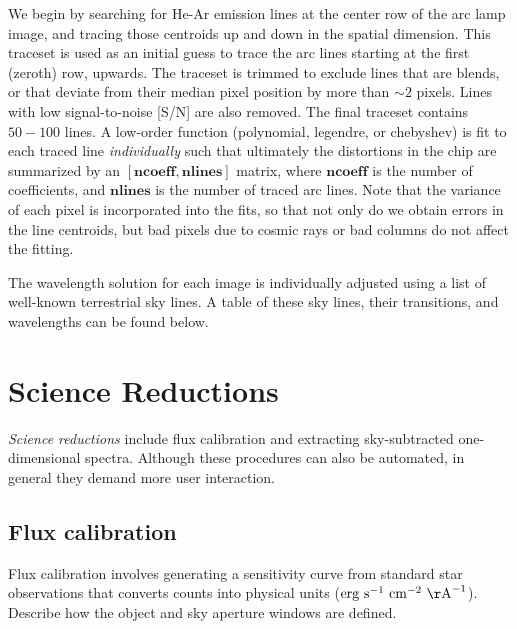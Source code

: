 \documentclass[12pt,preprint]{aastex}
\begin{document}

We begin by searching for He-Ar emission lines at the center row of
the arc lamp image, and tracing those centroids up and down in the
spatial dimension.  This traceset is used as an initial guess to trace
the arc lines starting at the first (zeroth) row, upwards.  The
traceset is trimmed to exclude lines that are blends, or that deviate
from their median pixel position by more than $\sim2$ pixels.  Lines
with low signal-to-noise [S/N] are also removed.  The final traceset
contains $50-100$ lines.  A low-order function (polynomial, legendre,
or chebyshev) is fit to each traced line \emph{individually} such that
ultimately the distortions in the chip are summarized by an
$[{\mathbf{ncoeff}},{\mathbf{nlines}}]$ matrix, where
${\mathbf{ncoeff}}$ is the number of coefficients, and
${\mathbf{nlines}}$ is the number of traced arc lines.  Note that the
variance of each pixel is incorporated into the fits, so that not only
do we obtain errors in the line centroids, but bad pixels due to
cosmic rays or bad columns do not affect the fitting.

The wavelength solution for each image is individually adjusted using
a list of well-known terrestrial sky lines.  A table of these sky
lines, their transitions, and wavelengths can be found below.

\section{Science Reductions}

{\em Science reductions} include flux calibration and extracting
sky-subtracted one-dimensional spectra.  Although these procedures can
also be automated, in general they demand more user interaction.

\subsection{Flux calibration}

Flux calibration involves generating a sensitivity curve from standard
star observations that converts counts into physical units (${\rm erg\
s}^{-1}\ {\rm cm}^{-2}\ {\rm \AA}^{-1}$).  Describe how the object and
sky aperture windows are defined.
\end{document}
